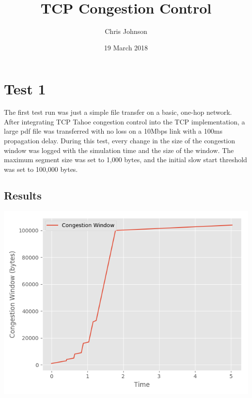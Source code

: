 \documentclass[fleqn,11pt]{article}
\begin{document}
	
	\lstset{
	  language=Python,
	  basicstyle=\small,          %
	  keywordstyle=\bfseries,
	  identifierstyle=,           %
	  commentstyle=,              %
	  stringstyle=\ttfamily,      %
	  showstringspaces=false,     %
	  numbers=left,
	  numberstyle=\tiny,
	  numbersep=5pt,
	  frame=tb,
	}
	
	\title{TCP Congestion Control}
	
	\author{Chris Johnson}
	
	\date{19 March 2018}
	
	\maketitle
	
	\section{Test 1}
	
	The first test run was just a simple file transfer on a basic, one-hop network.
	After integrating TCP Tahoe congestion control into the TCP implementation,
	a large pdf file was transferred with no loss on a 10Mbps link with a 100ms propagation delay.
	During this test, every change in the size of the congestion window was logged
	with the simulation time and the size of the window. The maximum segment size was set
	to 1,000 bytes, and the initial slow start threshold was set to 100,000 bytes.

	\subsection{Results}
	
	{
		\centering
		\includegraphics[]{cwnd1}
		
	}
	
\end{document}
